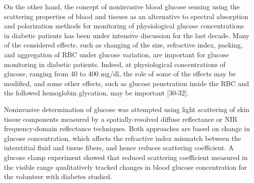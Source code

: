On the other hand, the concept of noninvasive blood glucose
sensing using the scattering properties of blood and tissues as an
alternative to spectral absorption and polarization methods for
monitoring of physiological glucose concentrations in diabetic
patients has been under intensive discussion for the last decade.
Many of the considered  effects, such as changing of the size,
refractive index, packing, and aggregation of RBC under glucose
variation, are important for glucose monitoring in diabetic
patients. Indeed, at physiological concentrations of glucose,
ranging from 40 to 400 mg/dl, the role of some of the effects may
be modified, and some other effects, such as glucose penetration
inside the RBC and the followed hemoglobin glycation, may be
important [30-32].

Noninvasive determination of glucose was attempted using light
scattering of skin tissue components measured by a
spatially-resolved diffuse reflectance or NIR fre\-quen\-cy-domain
reflectance techniques. Both approaches are based on change in
glucose concentration, which affects the refractive index mismatch
between the interstitial fluid and tissue fibers, and hence
reduces scattering coefficient. A glucose clamp experiment showed
that reduced scattering coefficient measured in the visible range
qualitatively tracked changes in blood glucose concentration for
the volunteer with diabetes studied.




